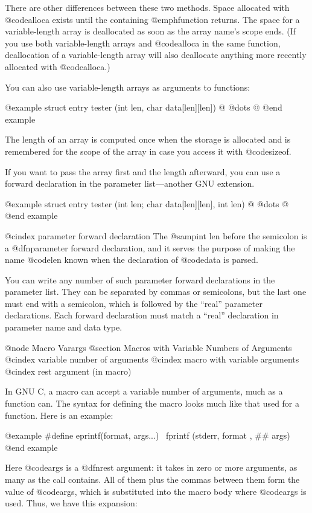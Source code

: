 {There are other differences between these two methods.  Space allocated
with @code{alloca} exists until the containing @emph{function} returns.
The space for a variable-length array is deallocated as soon as the array
name's scope ends.  (If you use both variable-length arrays and
@code{alloca} in the same function, deallocation of a variable-length array
will also deallocate anything more recently allocated with @code{alloca}.)

You can also use variable-length arrays as arguments to functions:

@example
struct entry
tester (int len, char data[len][len])
@{
  @dots{}
@}
@end example

The length of an array is computed once when the storage is allocated
and is remembered for the scope of the array in case you access it with
@code{sizeof}.

If you want to pass the array first and the length afterward, you can
use a forward declaration in the parameter list---another GNU extension.

@example
struct entry
tester (int len; char data[len][len], int len)
@{
  @dots{}
@}
@end example

@cindex parameter forward declaration
The @samp{int len} before the semicolon is a @dfn{parameter forward
declaration}, and it serves the purpose of making the name @code{len}
known when the declaration of @code{data} is parsed.

You can write any number of such parameter forward declarations in the
parameter list.  They can be separated by commas or semicolons, but the
last one must end with a semicolon, which is followed by the ``real''
parameter declarations.  Each forward declaration must match a ``real''
declaration in parameter name and data type.

@node Macro Varargs
@section Macros with Variable Numbers of Arguments
@cindex variable number of arguments
@cindex macro with variable arguments
@cindex rest argument (in macro)

In GNU C, a macro can accept a variable number of arguments, much as a
function can.  The syntax for defining the macro looks much like that
used for a function.  Here is an example:

@example
#define eprintf(format, args...)  \
 fprintf (stderr, format , ## args)
@end example

Here @code{args} is a @dfn{rest argument}: it takes in zero or more
arguments, as many as the call contains.  All of them plus the commas
between them form the value of @code{args}, which is substituted into
the macro body where @code{args} is used.  Thus, we have this expansion:

}
